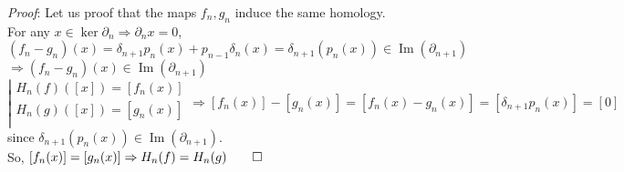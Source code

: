 \documentclass[11pt,a4paper]{report}
\DeclareMathOperator{\Ima}{Im}
\begin{document}
        \emph{Proof}: Let us proof that the maps $f_n, g_n$ induce the same homology.\\
        For any $x \in \ker\partial_n \Rightarrow \partial_nx = 0$, \\
        $(f_n - g_n)(x) = \delta_{n+1}p_n(x) + p_{n-1}\delta_n(x) = \delta_{n+1}(p_n(x)) \in \Ima(\partial_{n+1})$ \\
        $\Rightarrow (f_n - g_n)(x) \in \Ima(\partial_{n+1})$
            \[
				\left|
				  \begin{array}{l}
				  	H_n(f) ([x]) = [f_n(x)] \\
				  	H_n(g) ([x]) = [g_n(x)] \\
				  \end{array} \Rightarrow [f_n(x)] - [g_n(x)] = [f_n(x) - g_n(x)] = [\delta_{n+1}p_n(x)] = [0]
				\right.
			\]
			since $\delta_{n+1}(p_n(x)) \in \Ima(\partial_{n+1})$. \\
			So, $[f_n(x)] = [g_n(x)] \Rightarrow H_n(f) = H_n(g) \qed$ \\
			
\end{document}
